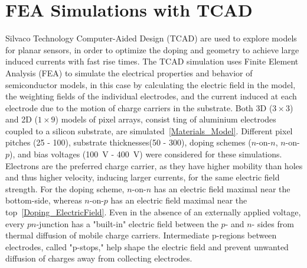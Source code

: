 \section{FEA Simulations with TCAD}
Silvaco Technology Computer-Aided Design (TCAD) are used to explore models for planar sensors, in order to optimize the doping and geometry to achieve large induced currents with fast rise times.
The TCAD simulation uses Finite Element Analysis (FEA) to simulate the electrical properties and behavior of semiconductor models, in this case by calculating the electric field in the model, the weighting fields of the individual electrodes, and the current induced at each electrode due to the motion of charge carriers in the substrate.
Both 3D ($3 \times 3$) and 2D ($1 \times 9$) models of pixel arrays, consist ting of aluminium electrodes coupled to a silicon substrate, are simulated~\ref{Materials_Model}.
Different pixel pitches (\SI{25}{\micron} - \SI{100}{\micron}), substrate thicknesses(\SI{50}{\micron} - \SI{300}{\micron}), doping schemes ($n$-on-$n$, $n$-on-$p$), and bias voltages (\SI{100}{\V} - \SI{400}{\V}) were considered for these simulations.
Electrons are the preferred charge carrier, as they have higher mobility than holes and thus higher velocity, inducing larger currents, for the same electric field strength.
For the doping scheme, $n$-on-$n$ has an electric field maximal near the bottom-side, whereas $n$-on-$p$ has an electric field maximal near the top~\ref{Doping_ElectricField}.
Even in the absence of an externally applied voltage, every $pn$-junction has a "built-in" electric field between the $p$- and $n$- sides from thermal diffusion of mobile charge carriers.
Intermediate p-regions between electrodes, called "p-stops," help shape the electric field and prevent unwanted diffusion of charges away from collecting electrodes.
